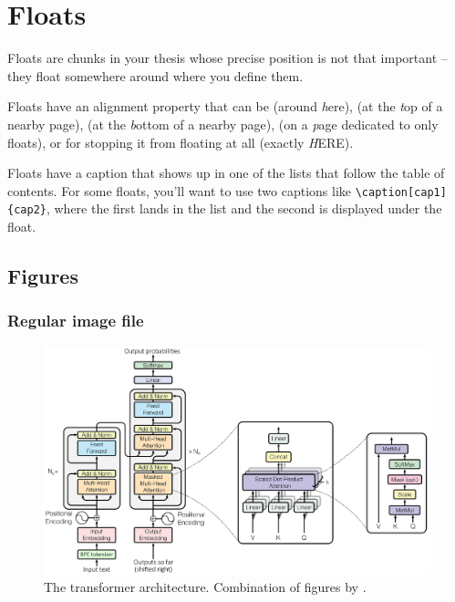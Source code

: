 \section{Floats}
Floats are chunks in your thesis whose precise position is not that important -- they float somewhere around where you define them.

Floats have an alignment property that can be  (around \emph{h}ere),  (at the \emph{t}op of a nearby page),  (at the \emph{b}ottom of a nearby page),  (on a \emph{p}age dedicated to only floats), or  for stopping it from floating at all (exactly \emph{H}ERE).

Floats have a caption that shows up in one of the lists that follow the table of contents. For some floats, you'll want to use two captions like \verb|\caption[cap1]{cap2}|, where the first lands in the list and the second is displayed under the float.

\subsection{Figures}
\subsubsection{Regular image file}
\begin{figure}[h]
	\centering
 	\includegraphics[width=\linewidth]{res/fig/vaswani-transformer}
	\caption[The transformer architecture]{The transformer architecture. Combination of figures by \textcite{vaswani_attention_2017}.}
	\label{fig:transformer}
\end{figure}

\newpage

